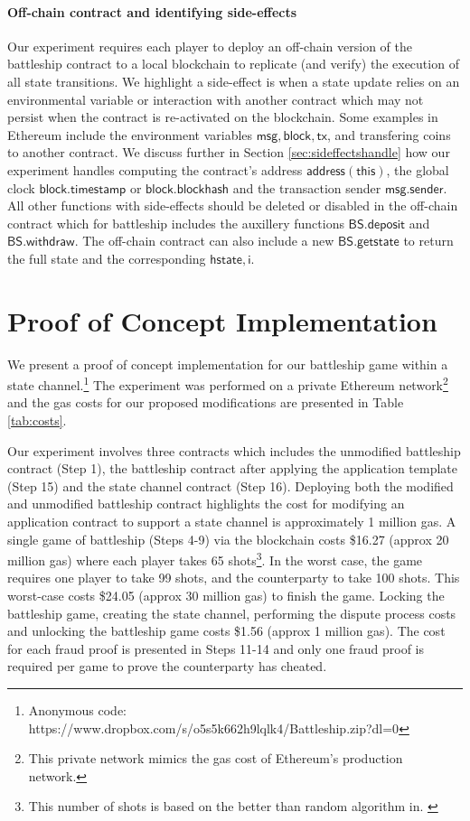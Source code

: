 \documentclass{llncs}
\newcommand{\hstate}{\mathsf{hstate}}
\newcommand{\monotoniccounter}{\mathsf{i}}
\newcommand{\battleshipdeposit}{\mathsf{BS.deposit}}
\newcommand{\battleshipwithdraw}{\mathsf{BS.withdraw}}
\newcommand{\battleshipgetstate}{\mathsf{BS.getstate}}
\begin{document}
	\paragraph{Off-chain contract and identifying side-effects} \label{sec:timers}
	
	Our experiment requires each player to deploy an off-chain version of the battleship contract to a local blockchain to replicate (and verify) the execution of all state transitions. 
	We highlight a side-effect is when a state update relies on an environmental variable or interaction with another contract which may not persist when the contract is re-activated on the blockchain. 
	Some examples in Ethereum include the environment variables $\mathsf{msg}, \mathsf{block}, \mathsf{tx}$, and transfering coins to another contract. 
	We discuss further in Section \ref{sec:sideffectshandle} how our experiment handles computing the contract's address $\mathsf{address(this)}$, the global clock $\mathsf{block.timestamp}$ or $\mathsf{block.blockhash}$ and the transaction sender $\mathsf{msg.sender}$. 
	All other functions with side-effects should be deleted or disabled in the off-chain contract which for battleship includes the auxillery functions $\battleshipdeposit$ and $\battleshipwithdraw$. 
	The off-chain contract can also include a new $\battleshipgetstate$ to return the full state and the corresponding $\hstate,\monotoniccounter$. 
	
	\section{Proof  of Concept Implementation}
	
	We present a proof of concept implementation for our battleship game within a state channel.\footnote{Anonymous code: https://www.dropbox.com/s/o5s5k662h9lqlk4/Battleship.zip?dl=0}
	The experiment was performed on a private Ethereum network\footnote{This private network mimics the gas cost of Ethereum's production network.} and the gas costs for our proposed modifications are presented in Table \ref{tab:costs}. 
	
	Our experiment involves three contracts which includes the unmodified battleship contract (Step 1), the battleship contract after applying the application template (Step 15) and the state channel contract (Step 16). 
	Deploying both the modified and unmodified battleship contract highlights the cost for modifying an application contract to support a state channel is approximately 1 million gas. 
	A single game of battleship (Steps 4-9) via the blockchain costs \$16.27 (approx 20 million gas) where each player takes 65 shots\footnote{This number of shots is based on the better than random algorithm in. \cite{battleshipdata}}.
	In the worst case, the game requires one player to take 99 shots, and the counterparty to take 100 shots. 
	This worst-case costs \$24.05 (approx 30 million gas) to finish the game.  
	Locking the battleship game, creating the state channel, performing the dispute process costs and unlocking the battleship game costs \$1.56 (approx 1 million gas). 
	The cost for each fraud proof is presented in Steps 11-14 and only one fraud proof is required per game to prove the counterparty has cheated. 
	
\end{document}
